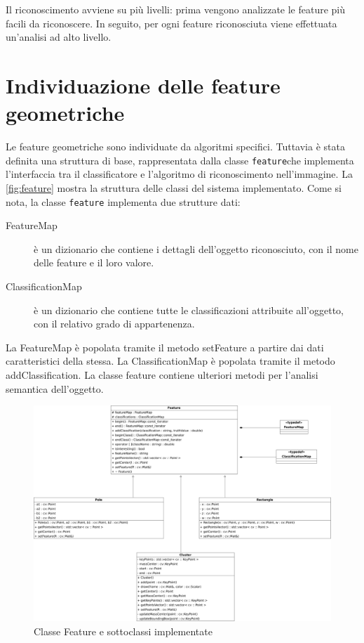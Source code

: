 Il riconoscimento avviene su più livelli: prima vengono analizzate le feature più facili da riconoscere. In seguito, per ogni feature riconosciuta viene effettuata un'analisi ad alto livello.

\section{Individuazione delle feature geometriche}

Le feature geometriche sono individuate da algoritmi specifici. Tuttavia è stata definita una struttura di base, rappresentata dalla classe \verb|feature|che implementa l'interfaccia tra il classificatore e l'algoritmo di riconoscimento nell'immagine.
La \autoref{fig:feature} mostra la struttura delle classi del sistema implementato. Come si nota, la classe \verb|feature| implementa due strutture dati:

\begin{description}
 \item [FeatureMap] è un dizionario che contiene i dettagli dell'oggetto riconosciuto, con il nome delle feature e il loro valore.
 \item [ClassificationMap] è un dizionario che contiene tutte le classificazioni attribuite all'oggetto, con il relativo grado di appartenenza.
\end{description}

La FeatureMap è popolata tramite il metodo setFeature a partire dai dati caratteristici della stessa.
La ClassificationMap è popolata tramite il metodo addClassification. La classe feature contiene ulteriori metodi per l'analisi semantica dell'oggetto.

\begin{figure}[ht]
  \includegraphics[width=\textwidth]{diagrammi/Feature}
  \caption{Classe Feature e sottoclassi implementate}
  \label{fig:feature}
\end{figure}

